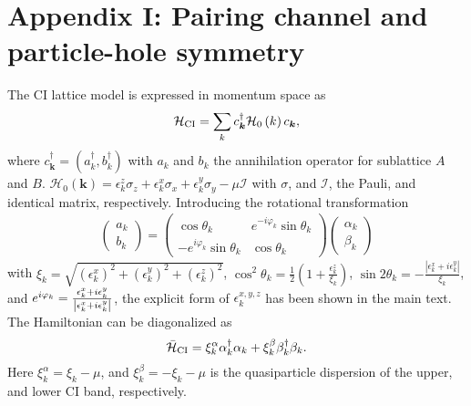 \documentclass[12pt]{iopart}
\begin{document}
\section*{Appendix I: Pairing channel and particle-hole symmetry}
\label{Adix1}
The CI lattice model is expressed in momentum space as
\begin{equation}
\mathcal{H}_{\rm CI}=\sum_{k}c_{\bm{k}}^{\dagger}\mathcal{H}_{0}\left( k\right) c_{\bm{k}},
\end{equation}%
where $c_{\bm{k}}^{\dag}=(a_{k}^{\dag}, b_{k}^{\dag})$ with $a_{k}$ and $b_{k}$ the annihilation operator for sublattice $A$ and $B$. $\mathcal{H}_{0}(\bm{k})=\epsilon^{z}_{k}\sigma_{z}+\epsilon^{x}_{k}\sigma_{x}+\epsilon^{y}_{k}\sigma_{y}-\mu\mathcal{I}$ with $\sigma$, and $\mathcal{I}$, the Pauli, and identical matrix, respectively. Introducing the
rotational transformation %
\begin{eqnarray}
\left(
\begin{array}{c}
a_{k} \\
b_{k}%
\end{array}%
\right) =\left(
\begin{array}{cc}
\cos \theta _{k} & e^{-i\varphi _{k}}\sin \theta _{k} \\
-e^{i\varphi _{k}}\sin \theta _{k} & \cos \theta _{k}%
\end{array}%
\right) \left(
\begin{array}{c}
\alpha_{k} \\
\beta_{k}%
\end{array}%
\right)
\end{eqnarray}%
with $%
\xi _{k}=\sqrt{\left( \epsilon _{k}^{x}\right) ^{2}+\left( \epsilon
_{k}^{y}\right) ^{2}+\left( \epsilon _{k}^{z}\right) ^{2}}$, $\cos ^{2}\theta
_{k}=\frac{1}{2}\left( 1+\frac{\epsilon ^{z}_{k}}{\xi _{k}}\right) $, $\sin
2\theta _{k}=-\frac{\left\vert \epsilon ^{x}_{k}+i\epsilon ^{y}_{k}\right\vert }{\xi
_{k}}$, and $e^{i\varphi _{k}}=\frac{\epsilon ^{x}_{k}+i\epsilon ^{y}_{k}}{%
\left\vert \epsilon ^{x}_{k}+i\epsilon ^{y}_{k}\right\vert }$, the explicit form of $\epsilon^{x,y,z}_{k}$ has been shown in the main text.
The Hamiltonian can be diagonalized as%
\begin{equation}
\bar{\mathcal{H}}_{\rm CI}=\xi _{k}^{\alpha}\alpha_{k}^{\dagger}\alpha_{k}+\xi _{k}^{\beta}\beta%
_{k}^{\dagger}\beta_{k}.
\end{equation}%
Here $\xi _{k}^{\alpha}=\xi _{k}-\mu$, and $\xi _{k}^{\beta}=-\xi _{k}-\mu$ is the quasiparticle
dispersion of the upper, and lower CI band, respectively.
\end{document}
